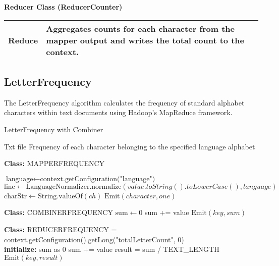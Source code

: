 \textbf{Reducer Class (ReducerCounter)}
\begin{longtable}{|>{\raggedright\arraybackslash}p{}|>{\raggedright\arraybackslash}p{}|}
    \hline
    Reduce & Aggregates counts for each character from the mapper output and writes the total count to the context. \\
    \hline
\end{longtable}



\subsection{LetterFrequency}

The LetterFrequency algorithm calculates the frequency of standard alphabet characters within text documents using Hadoop's MapReduce framework.\\




\begin{algorithm}
    \caption{LetterFrequency with Combiner}
    \begin{algorithmic}[1]
    \Require Txt file
    \Ensure Frequency of each character belonging to the specified language alphabet
    \\
    \Statex
    
    \textbf{Class:} MAPPERFREQUENCY

        \State $\text{language} \gets \text{context.getConfiguration("language")}$ 
    \EndProcedure\\

        \State $\text{line} \gets \text{LanguageNormalizer.normalize}(value.toString().toLowerCase(), language)$
                \State $\text{charStr} \gets \text{String.valueOf}(ch)$
                \State $\text{Emit}(character, one)$
        \EndFor
    \EndProcedure\\
    
    \Statex
    
    \textbf{Class:} COMBINERFREQUENCY
                \State $\text{sum} \gets 0$
            \State sum += value
        \EndFor
        \State $\text{Emit}(key, sum)$
    \EndProcedure\\
    
    \Statex
    
    \textbf{Class:} REDUCERFREQUENCY
        \State {} = context.getConfiguration().getLong("totalLetterCount", 0)
    \EndProcedure\\
    
        \State \textbf{initialize:} sum as 0
            \State sum += value
        \EndFor
        \State result = sum / TEXT\_LENGTH
        \State $\text{Emit}(key, result)$
    \EndProcedure
    
    \end{algorithmic}
    \end{algorithm}


